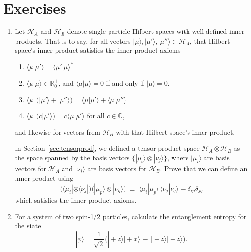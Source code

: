 \documentclass[pra,12pt]{revtex4}
\begin{document}
\section*{Exercises}

\begin{enumerate}
\item Let $\mathscr{H}_A$ and $\mathscr{H}_B$ denote single-particle
  Hilbert spaces with well-defined inner products.  That is to say,
  for all vectors $|\mu\rangle, |\mu'\rangle, |\mu''\rangle \in
  \mathscr{H}_A$, that Hilbert space's inner product satisfies the
  inner product axioms
  \begin{enumerate}
  \item $\langle \mu|\mu' \rangle = \langle\mu'|\mu\rangle^*$
  \item $\langle \mu|\mu \rangle \in \mathbb{R}^+_0$, and $\langle \mu|\mu \rangle = 0$ if and only if $|\mu\rangle = 0$.
  \item $\langle\mu| \, \big(|\mu'\rangle + |\mu'' \rangle\big)
    = \langle \mu|\mu'\rangle + \langle \mu|\mu''\rangle$
  \item $\langle \mu | \,\big(c|\mu'\rangle\big) = c\langle\mu|\mu'\rangle$ for all $c\in\mathbb{C}$,
  \end{enumerate}
  and likewise for vectors from $\mathscr{H}_B$ with that Hilbert
  space's inner product.

  In Section~\ref{sec:tensorprod}, we defined a tensor product space
  $\mathscr{H}_A\otimes\mathscr{H}_B$ as the space spanned by the
  basis vectors $\{|\mu_i\rangle\otimes|\nu_j\rangle\}$, where
  $|\mu_i\rangle$ are basis vectors for $\mathscr{H}_A$ and
  $|\nu_j\rangle$ are basis vectors for $\mathscr{H}_B$.  Prove that
  we can define an inner product using
  \begin{equation}
    \Big(\langle\mu_i| \otimes \langle\nu_j| \Big) \Big(|\mu_p\rangle \otimes |\nu_q\rangle\Big) \;\equiv\; \langle\mu_i|\mu_p\rangle \, \langle\nu_j|\nu_q\rangle = \delta_{ip}\delta_{jq}
  \end{equation}
  which satisfies the inner product axioms.
  \label{ex:innerprod}

\item For a system of two spin-1/2 particles, calculate the
  entanglement entropy for the state
  \begin{equation}
    |\psi\rangle = \frac{1}{\sqrt{2}} \Big(|\!+\!z\rangle|\!+\!x\rangle \,-\, |\!-\!z\rangle|\!+\!z\rangle\Big).
  \end{equation}
\end{enumerate}
\end{document}
